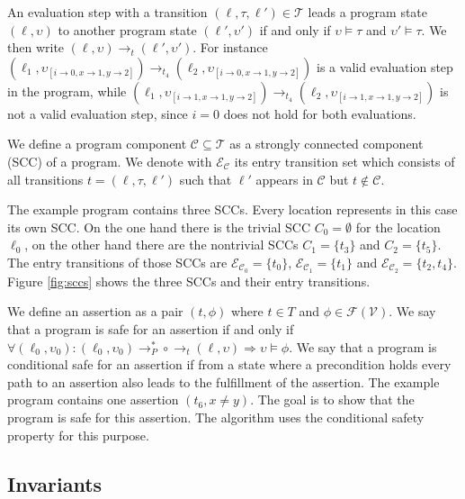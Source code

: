 An evaluation step with a transition $(\ell, \tau, \ell') \in \mathcal{T}$ leads a program state $(\ell, \upsilon)$ to another program state $(\ell', \upsilon')$ if and only if $\upsilon \models \tau$ and $\upsilon' \models \tau$. We then write $(\ell, \upsilon) \rightarrow_t (\ell', \upsilon')$.
For instance $(\ell_1,\upsilon_{[i \rightarrow 0, x \rightarrow 1, y \rightarrow 2]}) \rightarrow_{t_4} (\ell_2,\upsilon_{[i \rightarrow 0, x \rightarrow 1, y \rightarrow 2]})$ is a valid evaluation step in the program, while $(\ell_1,\upsilon_{[i \rightarrow 1, x \rightarrow 1, y \rightarrow 2]}) \rightarrow_{t_4} (\ell_2,\upsilon_{[i \rightarrow 1, x \rightarrow 1, y \rightarrow 2]})$ is not a valid evaluation step, since $i = 0$ does not hold for both evaluations.

We define a program component $\mathcal{C} \subseteq \mathcal{T}$ as a strongly connected component (SCC) of a program.
We denote with $\mathcal{E}_\mathcal{C}$ its entry transition set which consists of all transitions $t = (\ell, \tau, \ell')$ such that $\ell'$ appears in $\mathcal{C}$ but $t \notin \mathcal{C}$.

The example program contains three SCCs. Every location represents in this case its own SCC. On the one hand there is the trivial SCC $C_0 = \emptyset$ for the location $\ell_0$, on the other hand there are the nontrivial SCCs $C_1 = \lbrace t_3 \rbrace$ and $C_2 = \lbrace t_5 \rbrace$.
The entry transitions of those SCCs are $\mathcal{E}_{\mathcal{C}_0} = \lbrace t_0 \rbrace$, $\mathcal{E}_{\mathcal{C}_1} = \lbrace t_1 \rbrace$ and $\mathcal{E}_{\mathcal{C}_2} = \lbrace t_2, t_4 \rbrace$.
Figure \ref{fig:sccs} shows the three SCCs and their entry transitions.



We define an assertion as a pair $(t, \phi)$ where $t \in T$ and $\phi \in \mathcal{F}(\mathcal{V})$.
We say that a program is safe for an assertion if and only if $\forall (\ell_0, \upsilon_0): (\ell_0, \upsilon_0) \rightarrow_P^* \circ \rightarrow_t (\ell, \upsilon) \Rightarrow \upsilon \models \phi$.
We say that a program is conditional safe for an assertion if from a state where a precondition holds every path to an assertion also leads to the fulfillment of the assertion.
The example program contains one assertion $(t_6, x \neq y)$. The goal is to show that the program is safe for this assertion. The algorithm uses the conditional safety property for this purpose.

\subsection{Invariants}


